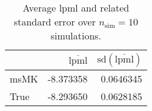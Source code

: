 \begin{table}[H]

\caption{Average lpml and related standard error over $n_{\text{sim}} = 10$ simulations.}
\centering
\begin{tabular}[t]{lrr}
\toprule
  & $\overbar{\text{lpml}}$ & $\text{sd}(\overbar{\text{lpml}})$\\
\midrule
msMK & -8.373358 & 0.0646345\\
True & -8.293650 & 0.0628185\\
\bottomrule
\end{tabular}
\end{table}
